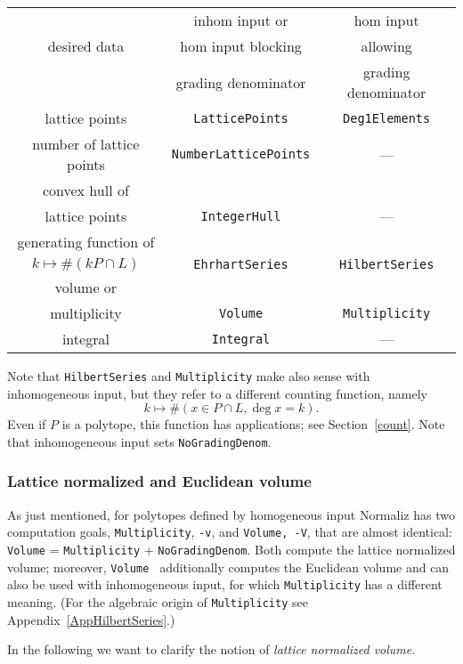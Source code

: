 \begin{center}
	\begin{tabular}[pos]{|c|c|c|}
		\hline
		& inhom input or& hom input\\
		desired data & hom input blocking & allowing\\
		&grading denominator& grading denominator\\
		\hline\hline
		lattice points &\verb|LatticePoints|&\verb|Deg1Elements|\\
		\hline
		number of lattice points& \verb|NumberLatticePoints|& ---\\
		\hline
		convex hull of&&\\
		lattice points& \verb|IntegerHull|& ---\\
		\hline
		generating function of&&\\
		$k\mapsto \#(kP\cap L) $&\verb|EhrhartSeries|&\verb|HilbertSeries|\\
		\hline
		volume or&&\\
		multiplicity& \verb|Volume|&\verb|Multiplicity|\\
		\hline
		integral&\verb|Integral|&---\\
		\hline
	\end{tabular}
\end{center}

Note that \verb|HilbertSeries| and \verb|Multiplicity| make also sense with inhomogeneous input, but they refer to a different counting function, namely
$$
k\mapsto \#(x\in P\cap L, \deg x=k).
$$
Even if $P$ is a polytope, this function has applications; see Section~\ref{count}. Note that inhomogeneous input sets \verb|NoGradingDenom|.

\subsubsection{Lattice normalized and Euclidean volume}\label{volume}

As just mentioned, for polytopes defined by homogeneous input Normaliz has two computation goals, \verb|Multiplicity|, \verb|-v|, and \verb|Volume, -V|, that are almost identical: \verb|Volume| = \verb|Multiplicity| + \verb|NoGradingDenom|. Both compute the lattice normalized volume; moreover, \verb|Volume | additionally computes the Euclidean volume and can also be used with inhomogeneous input, for which \verb|Multiplicity| has a different meaning. (For the algebraic origin of \verb|Multiplicity| see Appendix~\ref{AppHilbertSeries}.)

In the following we want to clarify the notion of \emph{lattice normalized volume}.

